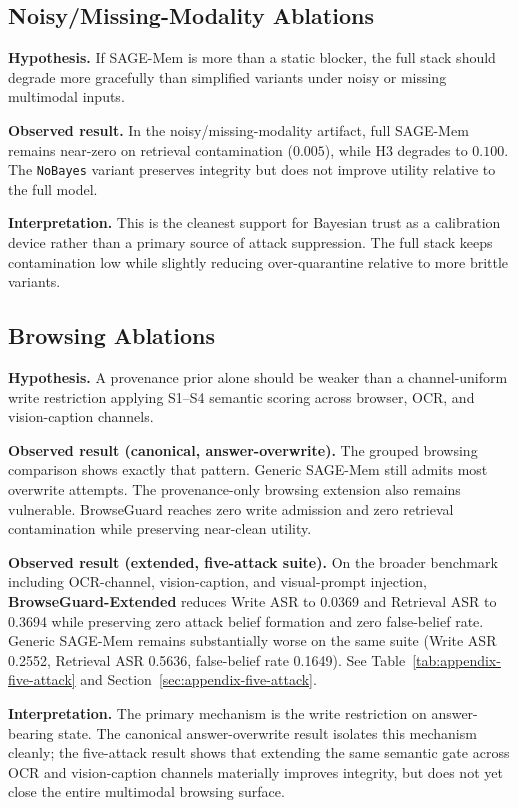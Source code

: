 \documentclass{article}
\begin{document}
\subsection{Noisy/Missing-Modality Ablations}

\noindent\textbf{Hypothesis.} If SAGE-Mem is more than a static blocker, the full stack should degrade more gracefully than simplified variants under noisy or missing multimodal inputs.

\noindent\textbf{Observed result.} In the noisy/missing-modality artifact, full SAGE-Mem remains near-zero on retrieval contamination (\(0.005\)), while H3 degrades to \(0.100\). The \texttt{NoBayes} variant preserves integrity but does not improve utility relative to the full model.

\noindent\textbf{Interpretation.} This is the cleanest support for Bayesian trust as a calibration device rather than a primary source of attack suppression. The full stack keeps contamination low while slightly reducing over-quarantine relative to more brittle variants.

\subsection{Browsing Ablations}

\noindent\textbf{Hypothesis.} A provenance prior alone should be weaker than a channel-uniform write restriction applying S1--S4 semantic scoring across browser, OCR, and vision-caption channels.

\noindent\textbf{Observed result (canonical, answer-overwrite).} The grouped browsing comparison shows exactly that pattern. Generic SAGE-Mem still admits most overwrite attempts. The provenance-only browsing extension also remains vulnerable. BrowseGuard reaches zero write admission and zero retrieval contamination while preserving near-clean utility.

\noindent\textbf{Observed result (extended, five-attack suite).} On the broader benchmark including OCR-channel, vision-caption, and visual-prompt injection, \textbf{BrowseGuard-Extended} reduces Write ASR to 0.0369 and Retrieval ASR to 0.3694 while preserving zero attack belief formation and zero false-belief rate. Generic SAGE-Mem remains substantially worse on the same suite (Write ASR 0.2552, Retrieval ASR 0.5636, false-belief rate 0.1649). See Table~\ref{tab:appendix-five-attack} and Section~\ref{sec:appendix-five-attack}.

\noindent\textbf{Interpretation.} The primary mechanism is the write restriction on answer-bearing state. The canonical answer-overwrite result isolates this mechanism cleanly; the five-attack result shows that extending the same semantic gate across OCR and vision-caption channels materially improves integrity, but does not yet close the entire multimodal browsing surface.
\end{document}
